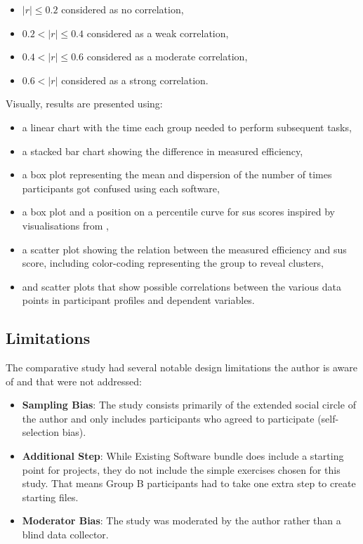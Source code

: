 \begin{itemize}
    \item $|r| \le 0.2$ considered as no correlation,
    \item $0.2 < |r| \le 0.4$ considered as a weak correlation,
    \item $0.4 < |r| \le 0.6$ considered as a moderate correlation,
    \item $0.6 < |r|$ considered as a strong correlation.
\end{itemize}

Visually, results are presented using:

\begin{itemize}
    \item a linear chart with the time each group needed to perform subsequent tasks,
    \item a stacked bar chart showing the difference in measured efficiency,
    \item a box plot representing the mean and dispersion of the number of times participants got confused using each software,
    \item a box plot and a position on a percentile curve for \gls{sus} scores inspired by visualisations from \textcite{Blattgerste_2022},
    \item a scatter plot showing the relation between the measured efficiency and \gls{sus} score, including color-coding representing the group to reveal clusters,
    \item and scatter plots that show possible correlations between the various data points in participant profiles and dependent variables.
\end{itemize}

\subsection{Limitations}

The comparative study had several notable design limitations the author is aware of and that were not addressed:

\begin{itemize}
    \item \textbf{Sampling Bias}: The study consists primarily of the extended social circle of the author and only includes participants who agreed to participate (self-selection bias).
    \item \textbf{Additional Step}: While Existing Software bundle does include a starting point for projects, they do not include the simple exercises chosen for this study. That means Group B participants had to take one extra step to create starting files.
    \item \textbf{Moderator Bias}: The study was moderated by the author rather than a blind data collector.
\end{itemize}
